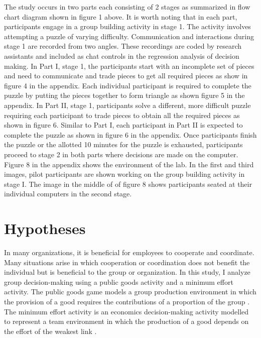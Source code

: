   \hspace  *{0mm} The study occurs in two parts each consisting of 2 stages as summarized in flow chart diagram shown in figure 1 above. It is worth noting that in each part, participants engage in a group building activity in stage 1. The activity involves attempting a puzzle of varying difficulty. Communication and interactions during stage 1 are recorded from two angles. These recordings are coded by research assistants and included as chat controls in the regression analysis of decision making. In Part I, stage 1, the participants start with an incomplete set of pieces and need to communicate and trade pieces to get all required pieces as show in figure 4 in the appendix. Each individual participant is required to complete the puzzle by putting the pieces together to form triangle as shown figure 5 in the appendix. In Part II, stage 1, participants solve a different, more difficult puzzle requiring each participant to trade pieces to obtain all the required pieces as shown in figure 6. Similar to Part I, each participant in Part II is expected to complete the puzzle as shown in figure 6 in the appendix. Once participants finish the puzzle or the allotted 10 minutes for the puzzle is exhausted, participants proceed to stage 2 in both parts where decisions are made on the computer. Figure 8 in the appendix shows the environment of the lab. In the first and third images, pilot participants are shown working on the group building activity in stage I. The image in the middle of of figure 8 shows participants seated at their individual computers in the second stage. 

\section{Hypotheses} \label{sec:Hypotheses}
In many organizations, it is beneficial for employees to cooperate and coordinate. Many situations arise in which cooperation or coordination does not benefit the individual but is beneficial to the group or organization. In this study, I analyze group decision-making using a public goods activity and a minimum effort activity. The public goods game models a group production environment in which the provision of a good requires the contributions of a proportion of the group \citep{c10,stoop2012lab,kagel2020handbook}. The minimum effort activity is an economics decision-making activity modelled to represent a team environment in which the production of a good depends on the effort of the weakest link \citep{vbb91}.

